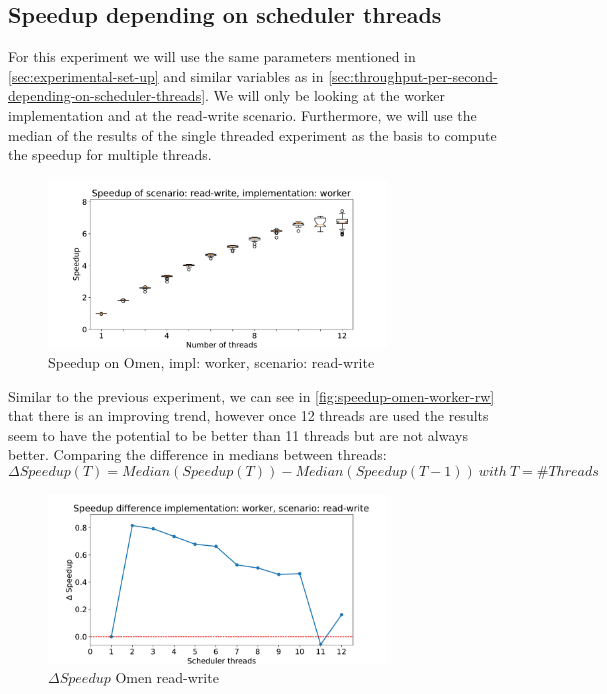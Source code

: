 \documentclass{article}
\begin{document}
\subsection{Speedup depending on scheduler threads}
For this experiment we will use the same parameters mentioned in
\autoref{sec:experimental-set-up} and similar variables as in
\autoref{sec:throughput-per-second-depending-on-scheduler-threads}. We will only
be looking at the worker implementation and at the read-write scenario.
Furthermore, we will use the median of the results of the single threaded
experiment as the basis to compute the speedup for multiple threads.
\begin{figure}[H]
	\centering
	\includegraphics[width=0.8\textwidth]{boxplots/omen/boxplot-speedup-of-scenario-read-write-implementation-worker.pdf}
	\caption{Speedup on Omen, impl: worker, scenario: read-write}
	\label{fig:speedup-omen-worker-rw}
\end{figure}
Similar to the previous experiment, we can see in \autoref{fig:speedup-omen-worker-rw} that there is an improving trend, however once
12 threads are used the results seem to have the potential to be better than 11
threads but are not always better.
Comparing the difference in medians between threads: $$\Delta Speedup(T) =
	Median(Speedup(T)) - Median(Speedup(T - 1))\:with\:T=\#Threads$$
\begin{figure}[H]
	\centering
	\includegraphics[width=0.8\textwidth]{plot/omen/plot-speedup-difference-implementation-worker-scenario-read-write.pdf}
	\caption{$\Delta Speedup$ Omen read-write}
	\label{fig:delta-speedup-omen-rw}
\end{figure}
\end{document}
